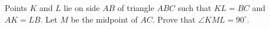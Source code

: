 Points $K$ and $L$ lie on side $AB$ of triangle $ABC$ such that $KL=BC$ and $AK=LB$. Let $M$ be the midpoint of $AC$. Prove that $\angle KML=90^\circ$.
